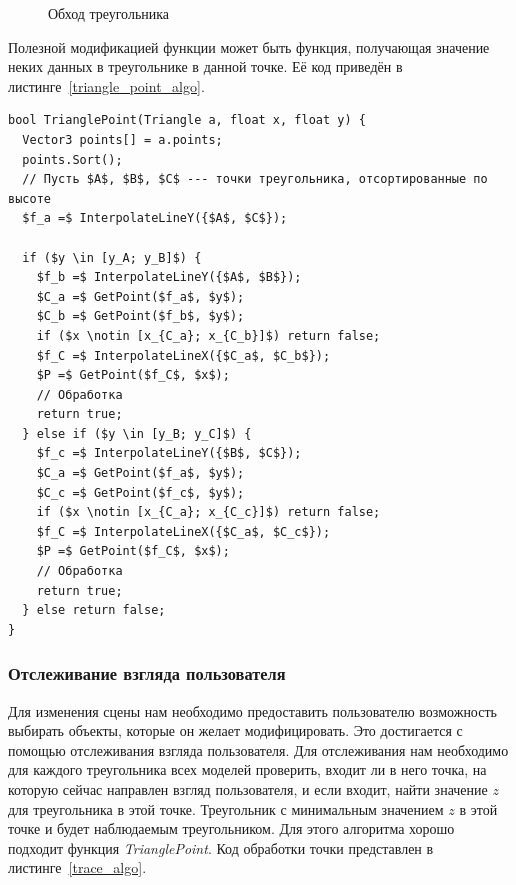 \documentclass[a4paper,12pt]{report}
\numberwithin{equation}{section}
\begin{document}
\begin{figure}[!h]
\centering
{}
\caption{Обход треугольника}
\label{triangle_traverse_img}
\end{figure}

Полезной модификацией функции может быть функция, получающая значение неких данных в треугольнике в данной точке. Её код приведён в листинге~\ref{triangle_point_algo}.

\begin{lstlisting}[float=h!,caption={Нахождение точки треугольника},label=triangle_point_algo]
bool TrianglePoint(Triangle a, float x, float y) {
  Vector3 points[] = a.points;
  points.Sort();
  // Пусть $A$, $B$, $C$ --- точки треугольника, отсортированные по высоте
  $f_a =$ InterpolateLineY({$A$, $C$});
  
  if ($y \in [y_A; y_B]$) {
    $f_b =$ InterpolateLineY({$A$, $B$});
    $C_a =$ GetPoint($f_a$, $y$);
    $C_b =$ GetPoint($f_b$, $y$);
    if ($x \notin [x_{C_a}; x_{C_b}]$) return false;
    $f_C =$ InterpolateLineX({$C_a$, $C_b$});
    $P =$ GetPoint($f_C$, $x$);
    // Обработка
    return true;
  } else if ($y \in [y_B; y_C]$) {
    $f_c =$ InterpolateLineY({$B$, $C$});
    $C_a =$ GetPoint($f_a$, $y$);
    $C_c =$ GetPoint($f_c$, $y$);
    if ($x \notin [x_{C_a}; x_{C_c}]$) return false;
    $f_C =$ InterpolateLineX({$C_a$, $C_c$});
    $P =$ GetPoint($f_C$, $x$);
    // Обработка
    return true;
  } else return false;
}
\end{lstlisting}

\subsubsection{Отслеживание взгляда пользователя}
Для изменения сцены нам необходимо предоставить пользователю возможность выбирать объекты, которые он желает модифицировать. Это достигается с помощью отслеживания взгляда пользователя. Для отслеживания нам необходимо для каждого треугольника всех моделей проверить, входит ли в него точка, на которую сейчас направлен взгляд пользователя, и если входит, найти значение $z$ для треугольника в этой точке. Треугольник с минимальным значением $z$ в этой точке и будет наблюдаемым треугольником. Для этого алгоритма хорошо подходит функция \textit{TrianglePoint}. Код обработки точки представлен в листинге~\ref{trace_algo}.
\end{document}

